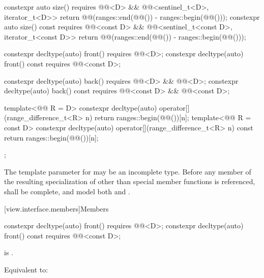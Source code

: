 \begin{codeblock}
{{    constexpr auto size() requires @@<D> &&
      @@<sentinel_t<D>, iterator_t<D>> {
        return @@(ranges::end(@@()) - ranges::begin(@@()));
      }
    constexpr auto size() const requires @@<const D> &&
      @@<sentinel_t<const D>, iterator_t<const D>> {
        return @@(ranges::end(@@()) - ranges::begin(@@()));
      }

    constexpr decltype(auto) front() requires @@<D>;
    constexpr decltype(auto) front() const requires @@<const D>;

    constexpr decltype(auto) back() requires @@<D> && @@<D>;
    constexpr decltype(auto) back() const
      requires @@<const D> && @@<const D>;

    template<@@ R = D>
      constexpr decltype(auto) operator[](range_difference_t<R> n) {
        return ranges::begin(@@())[n];
      }
    template<@@ R = const D>
      constexpr decltype(auto) operator[](range_difference_t<R> n) const {
        return ranges::begin(@@())[n];
      }
  };
}
\end{codeblock}

\pnum
The template parameter  for  may be an
incomplete type. Before any member of the resulting specialization of
 other than special member functions
is referenced,  shall be complete, and
model both  and .

[view.interface.members]{Members}

%
\begin{itemdecl}
constexpr decltype(auto) front() requires @@<D>;
constexpr decltype(auto) front() const requires @@<const D>;
\end{itemdecl}

\begin{itemdescr}
\pnum
\hardexpects
{} is .

\pnum
\effects
Equivalent to: 
\end{itemdescr}


